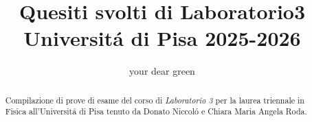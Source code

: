 

\title{
  \textbf{Quesiti svolti di Laboratorio3} \\
  \large Universit\'a di Pisa 2025-2026
}
\author{your dear green}


\maketitle
\begin{abstract}
  Compilazione di prove di esame del corso di \textit{Laboratorio 3}
  per la laurea triennale in Fisica all'Universit\'a di Pisa tenuto da
  Donato Niccol\'o e Chiara Maria Angela Roda.
\end{abstract}




\pagebreak



\pagebreak


\pagebreak

\pagebreak

\pagebreak

\pagebreak


\pagebreak

\pagebreak

\pagebreak


\pagebreak

\pagebreak


\pagebreak

\pagebreak

\pagebreak

\pagebreak

\pagebreak


\pagebreak

\pagebreak

\pagebreak

\pagebreak


\pagebreak

\pagebreak










\pagebreak



